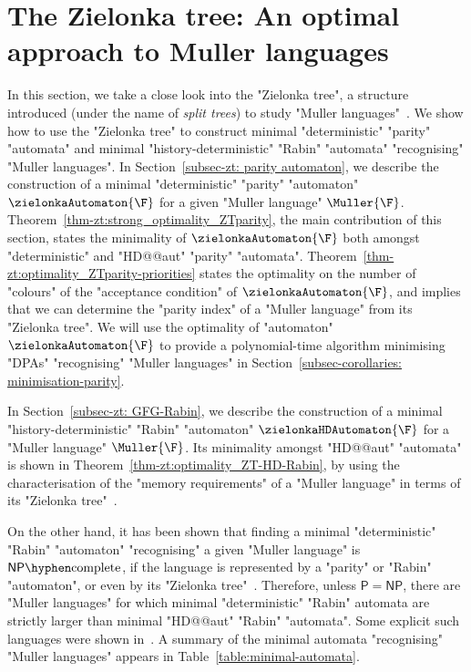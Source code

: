 \documentclass[10pt,a4paper]{amsart}
\newcommand{\NP}{\ensuremath{\mathsf{NP}}}
\newcommand{\PTime}{\ensuremath{\mathsf{P}}}
\newcommand{\NPcomplete}{\ensuremath{\mathsf{NP}\hyphen\mathrm{complete}}}
\begin{document}
	\section{The Zielonka tree: An optimal approach to Muller languages}\label{section:zielonka-tree}
	In this section, we take a close look into the "Zielonka tree", a structure introduced (under the name of \emph{split trees}) to study "Muller languages"~\cite{Zielonka1998infinite}.
We show how to use the "Zielonka tree" to construct minimal "deterministic" "parity" "automata" and minimal "history-deterministic" "Rabin" "automata" "recognising" "Muller languages".
In Section~\ref{subsec-zt: parity automaton}, we describe the construction of a minimal "deterministic" "parity" "automaton" $\zielonkaAutomaton{\F}$ for a given "Muller language" $\Muller{\F}$. Theorem~\ref{thm-zt:strong_optimality_ZTparity}, the main contribution of this section, states the minimality of $\zielonkaAutomaton{\F}$ both amongst "deterministic" and "HD@@aut" "parity" "automata". Theorem~\ref{thm-zt:optimality_ZTparity-priorities} states the optimality on the number of "colours" of the "acceptance condition" of $\zielonkaAutomaton{\F}$, and implies that we can determine the "parity index" of a "Muller language" from its "Zielonka tree".
We will use the optimality of "automaton" $\zielonkaAutomaton{\F}$ to provide a polynomial-time algorithm minimising "DPAs" "recognising" "Muller languages" in Section~\ref{subsec-corollaries: minimisation-parity}.

In Section~\ref{subsec-zt: GFG-Rabin}, we describe the construction of a minimal "history-deterministic" "Rabin" "automaton" $\zielonkaHDAutomaton{\F}$ for a "Muller language" $\Muller{\F}$. Its minimality amongst "HD@@aut" "automata" is shown in Theorem~\ref{thm-zt:optimality_ZT-HD-Rabin}, by using the characterisation of the "memory requirements" of a "Muller language" in terms of its "Zielonka tree"~\cite{DJW1997memory}.

On the other hand, it has been shown that finding a minimal "deterministic" "Rabin" "automaton" "recognising" a given "Muller language" is $\NPcomplete$, if the language is represented by a "parity" or "Rabin" "automaton", or even by its "Zielonka tree"~\cite{Casares2021Chromatic}.
Therefore, unless $\PTime = \NP$, there are "Muller languages" for which minimal "deterministic" "Rabin" automata are strictly larger than minimal "HD@@aut" "Rabin" "automata". Some explicit such languages were shown in~\cite[Section~4]{CCL22SizeGFG}.
A summary of the minimal automata "recognising" "Muller languages" appears in Table~\ref{table:minimal-automata}.
\end{document}

